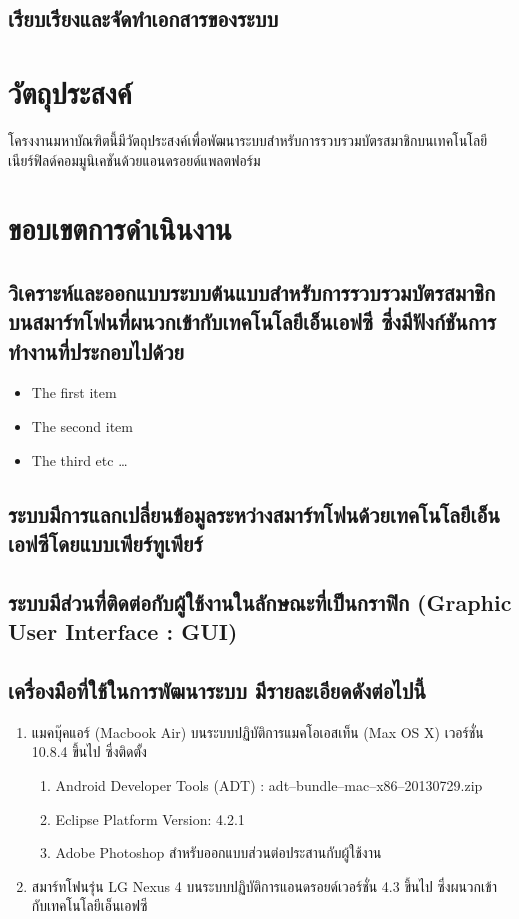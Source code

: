 \documentclass[a4paper]{article}
\begin{document}
\subsection{เรียบเรียงและจัดทําเอกสารของระบบ}


\section{วัตถุประสงค์}
โครงงานมหาบัณฑิตนี้มีวัตถุประสงค์เพื่อพัฒนาระบบสำหรับการรวบรวมบัตรสมาชิกบนเทคโนโลยีเนียร์ฟิลด์คอมมูนิเคชันด้วยแอนดรอยด์แพลตฟอร์ม

\section{ขอบเขตการดำเนินงาน}
\subsection{วิเคราะห์และออกแบบระบบต้นแบบสำหรับการรวบรวมบัตรสมาชิกบนสมาร์ทโฟนที่ผนวกเข้ากับเทคโนโลยีเอ็นเอฟซี ซึ่งมีฟังก์ชันการทำงานที่ประกอบไปด้วย}
\begin{itemize}
	\item The first item
	\item The second item
	\item The third etc \ldots
\end{itemize}
\subsection{ระบบมีการแลกเปลี่ยนข้อมูลระหว่างสมาร์ทโฟนด้วยเทคโนโลยีเอ็นเอฟซีโดยแบบเพียร์ทูเพียร์}
\subsection{ระบบมีส่วนที่ติดต่อกับผู้ใช้งานในลักษณะที่เป็นกราฟิก (Graphic User Interface : GUI)}
\subsection{เครื่องมือที่ใช้ในการพัฒนาระบบ มีรายละเอียดดังต่อไปนี้}
\begin{enumerate}
	\item แมคบุ๊คแอร์ (Macbook Air) บนระบบปฏิบัติการแมคโอเอสเท็น (Max OS X) เวอร์ชั่น 10.8.4 ขึ้นไป ซึ่งติดตั้ง
	\begin{enumerate}
		\item Android Developer Tools (ADT) : adt--bundle--mac--x86--20130729.zip
		\item Eclipse Platform Version: 4.2.1
		\item Adobe Photoshop สำหรับออกแบบส่วนต่อประสานกับผู้ใช้งาน
	\end{enumerate}
  	\item สมาร์ทโฟนรุ่น LG Nexus 4 บนระบบปฏิบัติการแอนดรอยด์เวอร์ชั่น 4.3 ขึ้นไป ซึ่งผนวกเข้ากับเทคโนโลยีเอ็นเอฟซี
\end{enumerate}
\end{document}

